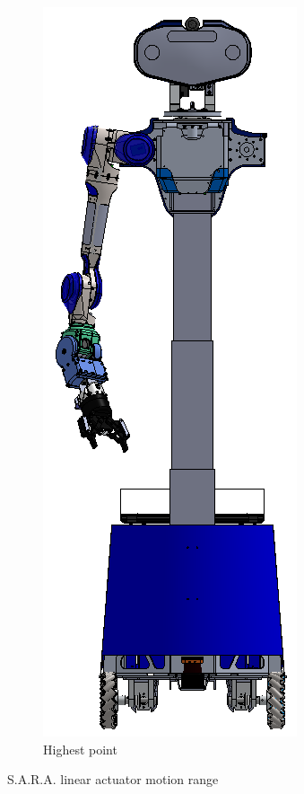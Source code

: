 \documentclass[runningheads,a4paper]{llncs}
\begin{document}
\begin{figure}[h!]
\begin{subfigure}[b]{0.2\linewidth}
    \includegraphics[width=\linewidth]{images/robot_high.PNG}
    \caption{Highest point}
  \end{subfigure}
  \caption{S.A.R.A. linear actuator motion range}
  \label{fig:coffee}
\end{figure}
\end{document}
